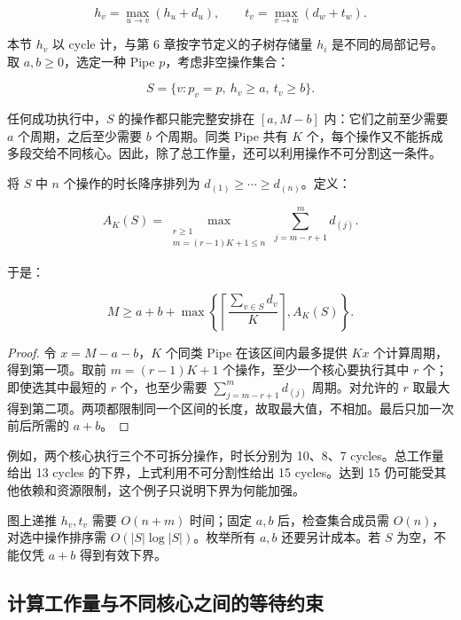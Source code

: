 \documentclass[anonymous,notoc]{gmcm2026}
\begin{document}
\begin{equation}
h_v = \max_{u \to v}(h_u + d_u), \qquad t_v = \max_{v \to w}(d_w + t_w).
\end{equation}

本节 \(h_v\) 以 cycle 计，与第 6 章按字节定义的子树存储量 \(h_i\) 是不同的局部记号。取 \(a, b \ge 0\)，选定一种 Pipe \(p\)，考虑非空操作集合：

\begin{equation}
S = \{v: p_v = p, \ h_v \ge a, \ t_v \ge b\}.
\end{equation}

任何成功执行中，\(S\) 的操作都只能完整安排在 \([a, M - b]\) 内：它们之前至少需要 \(a\) 个周期，之后至少需要 \(b\) 个周期。同类 Pipe 共有 \(K\) 个，每个操作又不能拆成多段交给不同核心。因此，除了总工作量，还可以利用操作不可分割这一条件。

将 \(S\) 中 \(n\) 个操作的时长降序排列为 \(d_{(1)} \ge \cdots \ge d_{(n)}\)。定义：

\begin{equation}
A_K(S) = \max_{\substack{r \ge 1 \\ m = (r-1)K+1 \le n}} \sum_{j=m-r+1}^{m} d_{(j)}.
\end{equation}

于是：

\begin{equation}
M \ge a + b + \max\left\{\left\lceil\frac{\sum_{v \in S} d_v}{K}\right\rceil, A_K(S)\right\}.
\end{equation}

\begin{proof} 令 \(x = M - a - b\)，\(K\) 个同类 Pipe 在该区间内最多提供 \(Kx\) 个计算周期，得到第一项。取前 \(m = (r-1)K + 1\) 个操作，至少一个核心要执行其中 \(r\) 个；即使选其中最短的 \(r\) 个，也至少需要 \(\sum_{j=m-r+1}^{m} d_{(j)}\) 周期。对允许的 \(r\) 取最大得到第二项。两项都限制同一个区间的长度，故取最大值，不相加。最后只加一次前后所需的 \(a + b\)。 \end{proof}

例如，两个核心执行三个不可拆分操作，时长分别为 10、8、7 cycles。总工作量给出 13 cycles 的下界，上式利用不可分割性给出 15 cycles。达到 15 仍可能受其他依赖和资源限制，这个例子只说明下界为何能加强。

图上递推 \(h_v, t_v\) 需要 \(O(n + m)\) 时间；固定 \(a, b\) 后，检查集合成员需 \(O(n)\)，对选中操作排序需 \(O(|S| \log |S|)\)。枚举所有 \(a, b\) 还要另计成本。若 \(S\) 为空，不能仅凭 \(a + b\) 得到有效下界。

\subsection{计算工作量与不同核心之间的等待约束}
\end{document}
